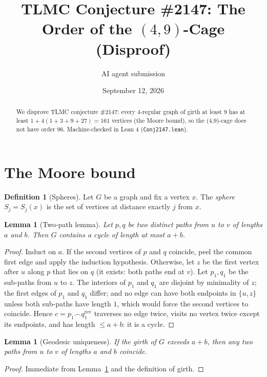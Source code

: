 \documentclass[11pt]{article}
\title{TLMC Conjecture \#2147: The Order of the $(4,9)$-Cage\\ (Disproof)}
\author{AI agent submission}
\date{September 12, 2026}
\newtheorem{lemma}[theorem]{Lemma}
\theoremstyle{definition}
\newtheorem{definition}[theorem]{Definition}
\theoremstyle{remark}
\theoremstyle{definition}
\begin{document}
\maketitle
\begin{abstract}
We disprove TLMC conjecture \#2147: every 4-regular graph of girth at least 9 has at least $1+4(1+3+9+27)=161$ vertices (the Moore bound), so the (4,9)-cage does not have order 96. Machine-checked in Lean 4 (\texttt{{Conj2147.lean}}).
\end{abstract}
\section{The Moore bound}

\begin{definition}[Spheres]
Let $G$ be a graph and fix a vertex $x$. The \emph{sphere} $S_j = S_j(x)$ is the set of vertices at distance exactly $j$ from $x$.
\end{definition}

\begin{lemma}[Two-path lemma]\label{lem:twopath}
Let $p, q$ be two distinct paths from $u$ to $v$ of lengths $a$ and $b$. Then $G$ contains a cycle of length at most $a + b$.
\end{lemma}

\begin{proof}
Induct on $a$. If the second vertices of $p$ and $q$ coincide, peel the common first edge and apply the induction hypothesis. Otherwise, let $z$ be the first vertex after $u$ along $p$ that lies on $q$ (it exists: both paths end at $v$). Let $p_1, q_1$ be the sub-paths from $u$ to $z$. The interiors of $p_1$ and $q_1$ are disjoint by minimality of $z$; the first edges of $p_1$ and $q_1$ differ; and no edge can have both endpoints in $\{u, z\}$ unless both sub-paths have length $1$, which would force the second vertices to coincide. Hence $c = p_1 \frown q_1^{\mathrm{rev}}$ traverses no edge twice, visits no vertex twice except its endpoints, and has length $\le a + b$: it is a cycle.
\end{proof}

\begin{lemma}[Geodesic uniqueness]\label{lem:geo}
If the girth of $G$ exceeds $a + b$, then any two paths from $u$ to $v$ of lengths $a$ and $b$ coincide.
\end{lemma}

\begin{proof}
Immediate from Lemma~\ref{lem:twopath} and the definition of girth.
\end{proof}
\end{document}
